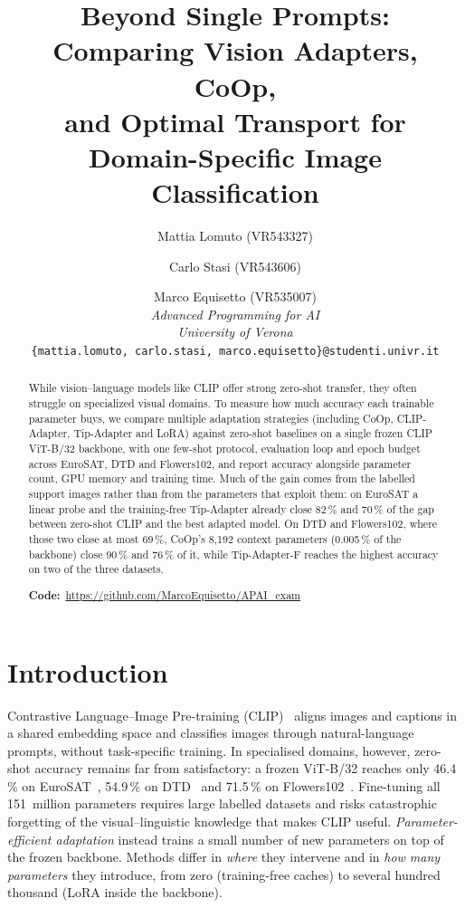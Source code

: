 \documentclass[10pt,twocolumn,letterpaper]{article}
\title{Beyond Single Prompts: Comparing Vision Adapters, CoOp,\\
and Optimal Transport for Domain-Specific Image Classification}
\author{
  Mattia Lomuto (VR543327)
  \and Carlo Stasi (VR543606)
  \and Marco Equisetto (VR535007)
  \\[4pt]
  \textit{Advanced Programming for AI}\\
  \textit{University of Verona}\\
  {\small\texttt{\{mattia.lomuto, carlo.stasi, marco.equisetto\}@studenti.univr.it}}
}
\date{}
\begin{document}
\maketitle

\begin{abstract}
While vision--language models like CLIP offer strong zero-shot transfer,
they often struggle on specialized visual domains.  To measure how much
accuracy each trainable parameter buys, we compare multiple adaptation
strategies (including CoOp, CLIP-Adapter, Tip-Adapter and LoRA) against
zero-shot baselines on a single frozen CLIP ViT-B/32 backbone, with one
few-shot protocol, evaluation loop and epoch budget across EuroSAT, DTD
and Flowers102, and report accuracy alongside parameter count, GPU memory
and training time.  Much of the gain comes from the labelled support
images rather than from the parameters that exploit them: on EuroSAT a
linear probe and the training-free Tip-Adapter already close 82\,\% and
70\,\% of the gap between zero-shot CLIP and the best adapted model.  On
DTD and Flowers102, where those two close at most 69\,\%, CoOp's
8{,}192 context parameters (0.005\,\% of the backbone) close 90\,\% and
76\,\% of it, while Tip-Adapter-F reaches the highest accuracy on two of
the three datasets.

\smallskip\noindent\textbf{Code:}~\url{https://github.com/MarcoEquisetto/APAI_exam}
\end{abstract}


\section{Introduction}\label{sec:introduction}

Contrastive Language--Image Pre-training (CLIP)~\cite{radford2021learning}
aligns images and captions in a shared embedding space and classifies
images through natural-language prompts, without task-specific training.
In specialised domains, however, zero-shot accuracy remains far from
satisfactory: a frozen ViT-B/32 reaches only 46.4\,\% on
EuroSAT~\cite{helber2019eurosat}, 54.9\,\% on
DTD~\cite{cimpoi2014describing} and 71.5\,\% on
Flowers102~\cite{nilsback2008automated}.  Fine-tuning all 151~million
parameters requires large labelled datasets and risks catastrophic
forgetting of the visual--linguistic knowledge that makes CLIP useful.
\emph{Parameter-efficient adaptation} instead trains a small number of new
parameters on top of the frozen backbone.  Methods differ in \emph{where}
they intervene and in \emph{how many parameters} they introduce, from zero
(training-free caches) to several hundred thousand (LoRA inside the
backbone).
\end{document}
